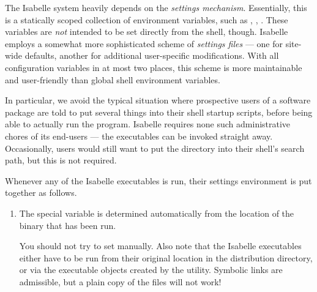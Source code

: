 \begin{isabellebody}
\begin{isamarkuptext}
\begin{enumerate}
  \end{enumerate}%
\end{isamarkuptext}%
\isamarkuptrue%
%
\isamarkuptrue%
%
\begin{isamarkuptext}%
The Isabelle system heavily depends on the \emph{settings
  mechanism}.  Essentially, this is a statically
  scoped collection of environment variables, such as \hyperlink{setting.ISABELLE-HOME}{\mbox{}}, \hyperlink{setting.ML-SYSTEM}{\mbox{}}, \hyperlink{setting.ML-HOME}{\mbox{}}.  These
  variables are \emph{not} intended to be set directly from the shell,
  though.  Isabelle employs a somewhat more sophisticated scheme of
  \emph{settings files} --- one for site-wide defaults, another for
  additional user-specific modifications.  With all configuration
  variables in at most two places, this scheme is more maintainable
  and user-friendly than global shell environment variables.

  In particular, we avoid the typical situation where prospective
  users of a software package are told to put several things into
  their shell startup scripts, before being able to actually run the
  program. Isabelle requires none such administrative chores of its
  end-users --- the executables can be invoked straight away.
  Occasionally, users would still want to put the \hyperlink{file.$ISABELLE-HOME/bin}{\mbox{}} directory into their shell's search path, but
  this is not required.%
\end{isamarkuptext}%
\isamarkuptrue%
%
\isamarkuptrue%
%
\begin{isamarkuptext}%
Whenever any of the Isabelle executables is run, their settings
  environment is put together as follows.

  \begin{enumerate}

  \item The special variable \hypertarget{setting.ISABELLE-HOME}{\hyperlink{setting.ISABELLE-HOME}{\mbox{}}} is
  determined automatically from the location of the binary that has
  been run.
  
  You should not try to set \hyperlink{setting.ISABELLE-HOME}{\mbox{}} manually. Also
  note that the Isabelle executables either have to be run from their
  original location in the distribution directory, or via the
  executable objects created by the \hyperlink{tool.install}{\mbox{}} utility.  Symbolic
  links are admissible, but a plain copy of the \hyperlink{file.$ISABELLE-HOME/bin}{\mbox{}} files will not work!


\end{enumerate}
\end{isamarkuptext}
\end{isabellebody}
